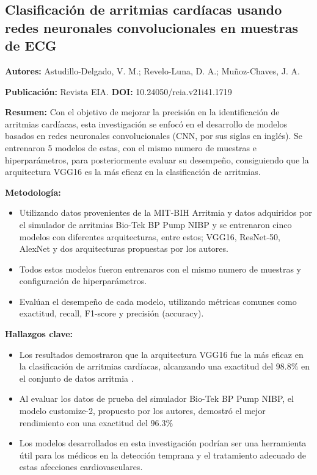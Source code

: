 \documentclass[12pt,letterpaper,oneside,openright]{book}
\begin{document}
\subsection{Clasificación de arritmias cardíacas usando redes neuronales convolucionales en muestras de ECG \cite{Astudillo24}}
\textbf{Autores:} Astudillo-Delgado, V. M.; Revelo-Luna, D. A.; Muñoz-Chaves, J. A.

\textbf{Publicación:} Revista EIA.
\textbf{DOI:} 10.24050/reia.v21i41.1719

\textbf{Resumen:} Con el objetivo de mejorar la precisión en la identificación de arritmias cardíacas, esta investigación se enfocó en el desarrollo de modelos basados en redes neuronales convolucionales (CNN, por sus siglas en inglés). Se entrenaron 5 modelos de estas, con el mismo numero de muestras e hiperparámetros, para posteriormente evaluar su desempeño, consiguiendo que la arquitectura VGG16 es la más eficaz en la clasificación de arritmias.

\textbf{Metodología:}
\begin{itemize}
	\item Utilizando datos provenientes de la MIT-BIH Arritmia \cite{arritmiadb} y datos adquiridos por el simulador de arritmias Bio-Tek BP Pump NIBP y se entrenaron cinco modelos con diferentes arquitecturas, entre estos; VGG16, ResNet-50, AlexNet y dos arquitecturas propuestas por los autores.
	\item Todos estos modelos fueron entrenaros con el mismo numero de muestras y configuración de hiperparámetros.
	\item Evalúan el desempeño de cada modelo, utilizando métricas comunes como exactitud, recall, F1-score y precisión (accuracy).
\end{itemize}

\textbf{Hallazgos clave:}
\begin{itemize}
	\item Los resultados demostraron que la arquitectura VGG16 fue la más eficaz en la clasificación de arritmias cardíacas, alcanzando una exactitud del $98.8\%$ en el conjunto de datos arritmia \cite{arritmiadb}. 
	\item Al evaluar los datos de prueba del simulador Bio-Tek BP Pump NIBP, el modelo customize-2, propuesto por los autores, demostró el mejor rendimiento con una exactitud del $96.3\%$
	\item Los modelos desarrollados en esta investigación podrían ser una herramienta útil para los médicos en la detección temprana y el tratamiento adecuado de estas afecciones cardiovasculares.
\end{itemize}
\end{document}
